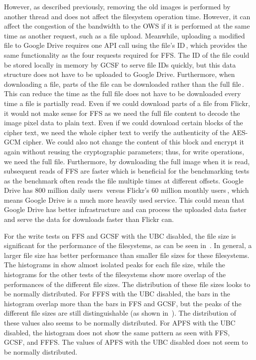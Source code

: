 However, as described previously, removing the old images is performed by another thread and does not affect the filesystem operation time. However, it can affect the congestion of the bandwidth to the \gls{OWS} if it is performed at the same time as another request, such as a file upload. Meanwhile, uploading a modified file to Google Drive requires one \gls{API} call using the file's ID\,\cite{FilesUpdateDrive2022}, which provides the same functionality as the four requests required for \gls{FFS}. The ID of the file could be stored locally in memory by \gls{GCSF} to serve file IDs quickly, but this data structure does not have to be uploaded to Google Drive. Furthermore, when downloading a file, parts of the file can be downloaded rather than the full file\,\cite{googleDownloadFilesDrive2022}. This can reduce the time as the full file does not have to be downloaded every time a file is partially read. Even if we could download parts of a file from Flickr, it would not make sense for \gls{FFS} as we need the full file content to decode the image pixel data to plain text. Even if we could download certain blocks of the cipher text, we need the whole cipher text to verify the authenticity of the \mbox{\gls{AES}-\gls{GCM}} cipher. We could also not change the content of this block and encrypt it again without reusing the cryptographic parameters; thus, for write operations, we need the full file. Furthermore, by downloading the full image when it is read, subsequent reads of \gls{FFS} are faster which is beneficial for the benchmarking tests as the benchmark often reads the file multiple times at different offsets. Google Drive has 800 million daily users\,\cite{lardinoisGoogleUpdatesDrive2017} versus Flickr's 60 million monthly users\,\cite{campbellFlickrStatistics20222022}, which means Google Drive is a much more heavily used service. This could mean that Google Drive has better infrastructure and can process the uploaded data faster and serve the data for downloads faster than Flickr can.

For the write tests on \gls{FFS} and \gls{GCSF} with the \gls{UBC} disabled, the file size is significant for the performance of the filesystems, as can be seen in~. In general, a larger file size has better performance than smaller file sizes for these filesystems. The histograms in   show almost isolated peaks for each file size, while the histograms for the other tests of the filesystems show more overlap of the performances of the different file sizes. The distribution of these file sizes looks to be normally distributed. For \gls{FFFS} with the \gls{UBC} disabled, the bars in the histogram overlap more than the bars in \gls{FFS} and \gls{GCSF}, but the peaks of the different file sizes are still distinguishable (as shown in~). The distribution of these values also seems to be normally distributed. For \gls{APFS} with the \gls{UBC} disabled, the histogram does not show the same pattern as seen with \gls{FFS}, \gls{GCSF}, and \gls{FFFS}. The values of \gls{APFS} with the \gls{UBC} disabled does not seem to be normally distributed.

